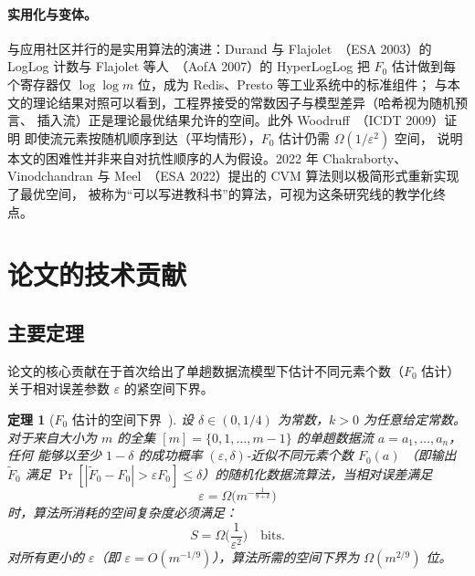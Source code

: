 \documentclass[UTF8, 11pt, a4paper, linestretch=1.15]{ctexart}
\theoremstyle{zhstyle}
\newtheorem{theorem}{定理}
\newcommand{\eps}{\varepsilon}
\newcommand{\Fzero}{F_0}
\begin{document}
	\paragraph{实用化与变体。}
	与应用社区并行的是实用算法的演进：Durand 与 Flajolet~\cite{DF03}（ESA 2003）的
	LogLog 计数与 Flajolet 等人~\cite{HLL07}（AofA 2007）的 HyperLogLog 把 $\Fzero$
	估计做到每个寄存器仅 $\log\log m$ 位，成为 Redis、Presto 等工业系统中的标准组件；
	与本文的理论结果对照可以看到，工程界接受的常数因子与模型差异（哈希视为随机预言、
	插入流）正是理论最优结果允许的空间。此外 Woodruff~\cite{Woo09}（ICDT 2009）证明
	即使流元素按随机顺序到达（平均情形），$\Fzero$ 估计仍需 $\Omega(1/\eps^2)$ 空间，
	说明本文的困难性并非来自对抗性顺序的人为假设。2022 年 Chakraborty、Vinodchandran
	与 Meel~\cite{CVM22}（ESA 2022）提出的 CVM 算法则以极简形式重新实现了最优空间，
	被称为“可以写进教科书”的算法，可视为这条研究线的教学化终点。
	
	\section{论文的技术贡献}
	
	\subsection{主要定理}
	
	论文的核心贡献在于首次给出了单趟数据流模型下估计不同元素个数（$\Fzero$ 估计）
	关于相对误差参数 $\eps$ 的紧空间下界。
	
	\begin{theorem}[$\Fzero$ 估计的空间下界~\cite{IW03}]
		设 $\delta \in (0, 1/4)$ 为常数，$k > 0$ 为任意给定常数。对于来自大小为 $m$
		的全集 $[m] = \{0, 1, \dots, m-1\}$ 的单趟数据流 $a = a_1, \dots, a_n$，任何
		能够以至少 $1-\delta$ 的成功概率 $(\eps, \delta)$-近似不同元素个数 $\Fzero(a)$
		（即输出 $\tilde{F}_0$ 满足 $\Pr[|\tilde{F}_0 - \Fzero| > \eps \Fzero] \leq
		\delta$）的随机化数据流算法，当相对误差满足
		\[
		\eps = \Omega\big(m^{-\frac{1}{9+k}}\big)
		\]
		时，算法所消耗的空间复杂度必须满足：
		\[
		S = \Omega\Big(\frac{1}{\eps^2}\Big) \quad \text{bits}.
		\]
		对所有更小的 $\eps$（即 $\eps = O(m^{-1/9})$），算法所需的空间下界为
		$\Omega(m^{2/9})$ 位。
	\end{theorem}
	
\end{document}
